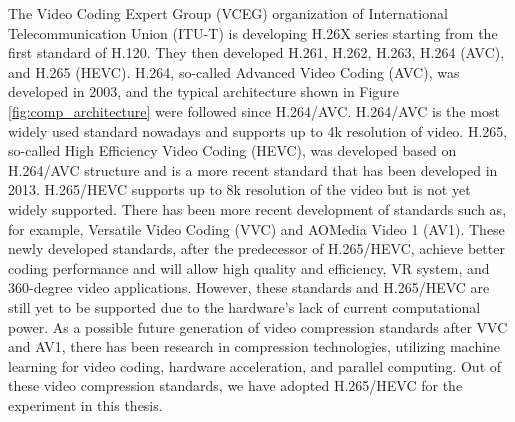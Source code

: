 The Video Coding Expert Group (VCEG) organization of International Telecommunication Union (ITU-T) is developing H.26X series starting from the first standard of H.120. They then developed H.261, H.262, H.263, H.264 (AVC), and H.265 (HEVC). H.264, so-called Advanced Video Coding (AVC), was developed in 2003, and the typical architecture shown in Figure \ref{fig:comp_architecture} were followed since H.264/AVC. H.264/AVC is the most widely used standard nowadays and supports up to 4k resolution of video. H.265, so-called High Efficiency Video Coding (HEVC), was developed based on H.264/AVC structure and is a more recent standard that has been developed in 2013. H.265/HEVC supports up to 8k resolution of the video but is not yet widely supported. There has been more recent development of standards such as, for example, Versatile Video Coding (VVC) and AOMedia Video 1 (AV1). These newly developed standards, after the predecessor of H.265/HEVC, achieve better coding performance and will allow high quality and efficiency, VR system, and 360-degree video applications. However, these standards and H.265/HEVC are still yet to be supported due to the hardware's lack of current computational power. As a possible future generation of video compression standards after VVC and AV1, there has been research in compression technologies, utilizing machine learning for video coding, hardware acceleration, and parallel computing. Out of these video compression standards, we have adopted H.265/HEVC for the experiment in this thesis.